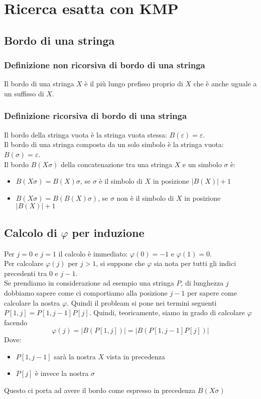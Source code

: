 \section{Ricerca esatta con KMP}
\subsection{Bordo di una stringa}
\subsubsection{Definizione non ricorsiva di bordo di una stringa}
Il bordo di una stringa $X$ è il più lungo prefisso proprio di $X$ che è anche uguale a un suffisso di $X$.

\subsubsection{Definizione ricorsiva di bordo di una stringa}
Il bordo della stringa vuota è la stringa vuota stessa: $B(\varepsilon) = \varepsilon$.\\
Il bordo di una stringa composta da un solo simbolo è la stringa vuota: $B(\sigma) = \varepsilon$.\\
Il bordo $B(X\sigma)$ della concatenazione tra una stringa $X$ e un simbolo $\sigma$ è: 
\begin{itemize}
    \item $B(X\sigma) = B(X)\sigma$, se $\sigma$ è il simbolo di $X$ in posizione $|B(X)|+1$
    \item $B(X\sigma) = B(B(X)\sigma)$, se $\sigma$ non è il simbolo di $X$ in posizione $|B(X)|+1$
\end{itemize}

\subsection{Calcolo di \texorpdfstring{$\varphi$}{} per induzione}
Per $j=0$ e $j=1$ il calcolo è immediato: $\varphi(0) = -1$ e $\varphi(1) = 0$. \\
Per calcolare $\varphi(j)$ per $j>1$, si suppone che $\varphi$ sia nota per tutti gli indici precedenti tra $0$ e $j-1$. \\

Se prendiamo in considerazione ad esempio una stringa $P$, di lunghezza $j$ dobbiamo sapere come ci comportiamo alla posizione $j-1$ per sapere come calcolare la nostra  $\varphi$.
Quindi il probleam si pone nei termini seguenti $P[1,j] = P[1, j-1]P[j]$. Quindi, teoricamente, siamo in grado di calcolare $\displaystyle \varphi$ facendo \[\varphi(j)=|B(P[1,j])| = |B( P[1, j-1]P[j])|\]
Dove:
\begin{itemize}
    \item $P[1, j-1]$ sarà la nostra $X$ vista in precedenza
    \item $P[j]$ è invece la nostra $\sigma$
\end{itemize}
Questo ci porta ad avere il bordo come espresso in precedenza $B(X\sigma)$

